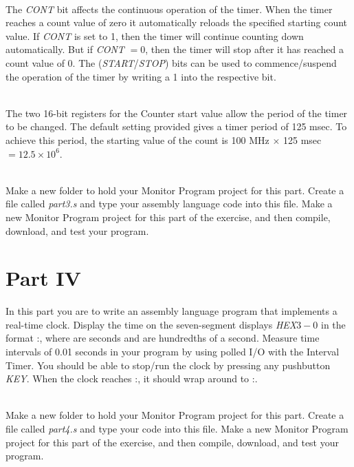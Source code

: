 \documentclass[epsfig,10pt,fullpage]{article}
\newcommand{\CommonDocsPath}{../../../../common/docs}
\begin{document}
~\\
The {\it CONT} bit affects the continuous operation of the timer.  When the timer reaches
a count value of zero it automatically reloads the specified starting count value. If 
{\it CONT} is set to 1, then the timer will continue counting down automatically.
But if {\it CONT} $=0$, then the timer will stop after it has reached a count value of 0. 
The ({\it START}/{\it STOP}) bits can be used to commence/suspend the operation of the 
timer by writing a 1 into the respective bit.

~\\
The two 16-bit registers for the Counter start value allow the period of the timer to be changed.
The default setting provided gives a timer period of 125 msec. To achieve this period, the starting value of the count is
100 MHz $\times$ 125 msec $=12.5\times10^6$.

~\\
Make a new folder to hold your Monitor Program project for this part. Create a
file called {\it part3.s} and type your assembly language code into this file.
Make a new Monitor Program project for this part of the exercise, and then compile, download, 
and test your program. 

\section*{Part IV}
In this part you are to write an assembly language program that implements a real-time clock. 
Display the time on the seven-segment displays {\it HEX}$3-0$ in the format 
:, where  are seconds and  are hundredths of a second.
Measure time intervals of 0.01 seconds in your program by using polled I/O with the
Interval Timer.  You should be able to stop/run the clock by pressing any pushbutton {\it KEY}.
When the clock reaches :, it should wrap around to :.

~\\
Make a new folder to hold your Monitor Program project for this part. Create a
file called {\it part4.s} and type your code into this file.  Make a new Monitor Program 
project for this part of the exercise, and then compile, download, and test your program. 



\end{document}
